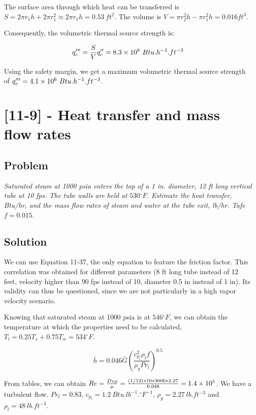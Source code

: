 The surface area through which heat can be transferred is $S = 2\pi r_1h + 2\pi r_1^2 \approx 2\pi r_1h = 0.53\ ft^2$. The volume is $V = \pi r_2^2h - \pi r_1^2h = 0.016 ft^{3}$.

Consequently, the volumetric thermal source strength is:

\begin{equation}
q'''_c = \frac{S}{V}q''_c = \text{\num{8.3e6}}\ Btu.h^{-1}.ft^{-3}
\end{equation}

Using the safety margin, we get a maximum volumetric thermal source strength of $q'''_c = \text{\num{4.1e6}}\ Btu.h^{-1}.ft^{-3}$.


\section{[11-9] - Heat transfer and mass flow rates}
\label{prob112}

\subsection{Problem}
\textit{Saturated steam at 1000 psia enters the top of a 1 in. diameter, 12 ft long vertical tube at 10 fps. The tube walls are held at $530{}^\circ F$. Estimate the heat transfer, Btu/hr, and the mass flow rates of steam and water at the tube exit, lb/hr. Tafe $f = 0.015$.} 

\subsection{Solution}


We can use Equation 11-37, the only equation to feature the friction factor. This correlation was obtained for different parameters (8 ft long tube instead of 12 feet, velocity higher than 90 fps instead of 10, diameter 0.5 in instead of 1 in). Its validity can thus be questioned, since we are not particularly in a high vapor velocity scenario.

Knowing that saturated steam at 1000 psia is at $546{}^\circ F$, we can obtain the temperature at which the properties need to be calculated, $T_l = 0.25T_s + 0.75T_w = 534{}^\circ F$.

\begin{equation}
\bar{h} = 0.046\bar{G}\left( \frac{c_{p_l}^2\rho_l f}{\rho_g Pr_l}\right)^{0.5}
\end{equation}

From tables, we can obtain $Re = \frac{Dv\rho}{\mu} = \frac{(1/12) * 10 * 3600 * 2.27}{0.048} = \text{\num{1.4e5}}$. We have a turbulent flow. $Pr_l = 0.83$, $c_{p_l} = 1.2\ Btu.lb^{-1}.{}^\circ F^{-1}$, $\rho_g = 2.27\ lb.ft^{-3}$ and $\rho_l = 48\ lb.ft^{-3}$.

